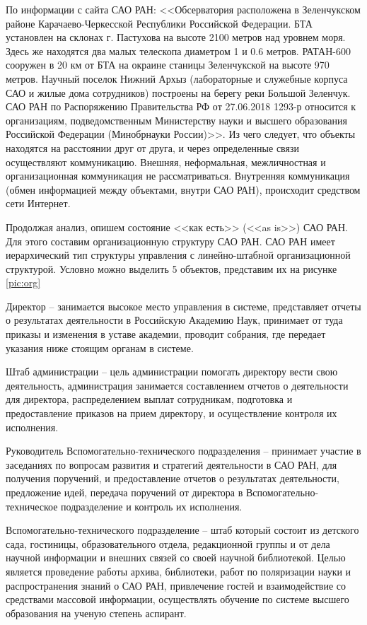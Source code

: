 По информации с сайта САО РАН: <<Обсерватория расположена в Зеленчукском районе Карачаево-Черкесской Республики Российской Федерации. БТА установлен на склонах г. Пастухова на высоте 2100 метров над уровнем моря. Здесь же находятся два малых телескопа диаметром 1 и 0.6 метров. РАТАН-600 сооружен в 20 км от БТА на окраине станицы Зеленчукской на высоте 970 метров. Научный поселок Нижний Архыз (лабораторные и служебные корпуса САО и жилые дома сотрудников) построены на берегу реки Большой Зеленчук. САО РАН по Распоряжению Правительства РФ от 27.06.2018 1293-р относится к организациям, подведомственным Министерству науки и высшего образования Российской Федерации (Минобрнауки России)>>\cite{Korn}. Из чего следует, что объекты находятся на расстоянии друг от друга, и через определенные связи осуществляют коммуникацию. Внешняя, неформальная, межличностная и организационная коммуникация не рассматриваться. Внутренняя коммуникация (обмен информацией между объектами, внутри САО РАН), происходит средством сети Интернет. 

 

Продолжая анализ, опишем состояние <<как есть>> (<<as is>>) САО РАН. Для этого составим организационную структуру САО РАН. САО РАН имеет иерархический тип структуры управления с линейно-штабной организационной структурой. Условно можно выделить 5 объектов, представим их  на рисунке \ref{pic:org}

Директор -- занимается высокое место управления в системе, представляет отчеты о результатах деятельности в Российскую Академию Наук, принимает от туда приказы и изменения в уставе академии, проводит собрания, где передает указания ниже стоящим органам в системе.
  
Штаб администрации -- цель администрации помогать директору вести свою деятельность, администрация занимается составлением отчетов о деятельности для директора, распределением выплат сотрудникам, подготовка и предоставление приказов на прием директору, и осуществление контроля их исполнения.

Руководитель Вспомогательно-технического подразделения -- принимает участие в заседаниях по вопросам развития и стратегий деятельности в САО РАН, для получения поручений, и предоставление отчетов о результатах деятельности, предложение идей, передача поручений от директора в Вспомогательно-техническое подразделение и контроль их исполнения. 

Вспомогательно-технического подразделение -- штаб который состоит из детского сада, гостиницы, образовательного отдела, редакционной группы и от дела научной информации и внешних связей со своей научной библиотекой. Целью является проведение работы архива, библиотеки, работ по поляризации науки и распространения знаний о САО РАН, привлечение гостей и взаимодействие со средствами массовой информации, осуществлять обучение по системе высшего образования на ученую степень аспирант. 

